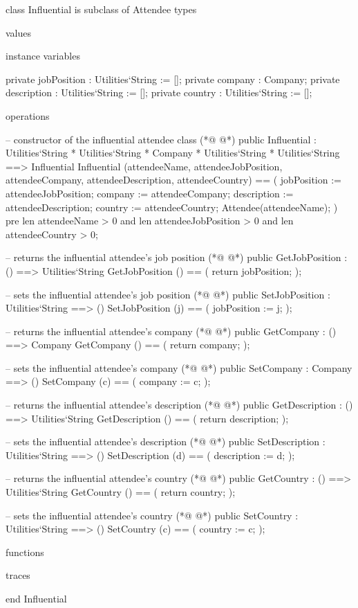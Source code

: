 \begin{vdmpp}[breaklines=true]
class Influential is subclass of Attendee
types

values


instance variables

 private jobPosition : Utilities`String := [];
 private company : Company;
 private description : Utilities`String := [];
 private country : Utilities`String := [];

operations

 -- constructor of the influential attendee class 
(*@
\label{Influential:17}
@*)
  public Influential : Utilities`String * Utilities`String * Company * Utilities`String * Utilities`String ==> Influential
    Influential (attendeeName, attendeeJobPosition, attendeeCompany, attendeeDescription, attendeeCountry) == (
      jobPosition := attendeeJobPosition;
      company := attendeeCompany;
      description := attendeeDescription;
      country := attendeeCountry;
     Attendee(attendeeName); 
    )
    pre len attendeeName > 0 and len attendeeJobPosition > 0 and len attendeeCountry > 0;
    
  -- returns the influential attendee's job position
(*@
\label{GetJobPosition:28}
@*)
  public GetJobPosition : () ==> Utilities`String
    GetJobPosition () == (
     return jobPosition;
    );
    
  -- sets the influential attendee's job position
(*@
\label{SetJobPosition:34}
@*)
  public SetJobPosition : Utilities`String ==> ()
    SetJobPosition (j) == (
     jobPosition := j;
    );
    
  -- returns the influential attendee's company
(*@
\label{GetCompany:40}
@*)
  public GetCompany : () ==> Company
    GetCompany () == (
     return company;
    );
    
   -- sets the influential attendee's company
(*@
\label{SetCompany:46}
@*)
  public SetCompany : Company ==> ()
    SetCompany (c) == (
     company := c;
    );
    
  -- returns the influential attendee's description
(*@
\label{GetDescription:52}
@*)
  public GetDescription : () ==> Utilities`String
    GetDescription () == (
     return description;
    );
    
   -- sets the influential attendee's description
(*@
\label{SetDescription:58}
@*)
  public SetDescription : Utilities`String ==> ()
    SetDescription (d) == (
     description := d;
    );
    
   -- returns the influential attendee's country
(*@
\label{GetCountry:64}
@*)
   public GetCountry : () ==> Utilities`String
    GetCountry () == (
     return country;
    );
    
   -- sets the influential attendee's country
(*@
\label{SetCountry:70}
@*)
  public SetCountry : Utilities`String ==> ()
    SetCountry (c) == (
     country := c;
    );
    
functions

traces

end Influential
\end{vdmpp}
